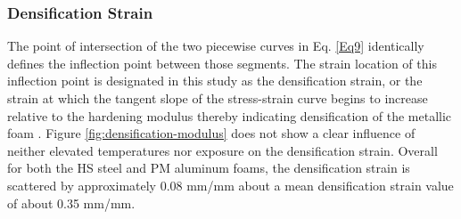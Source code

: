 \documentclass[review]{elsarticle}
\begin{document}
{\subsubsection{Densification Strain}

The point of intersection of the two piecewise curves in Eq. \ref{Eq9} identically defines the inflection point between those segments. The strain location of this inflection point is designated in this study as the densification strain, or the strain at which the tangent slope of the stress-strain curve begins to increase relative to the hardening modulus thereby indicating densification of the metallic foam . Figure \ref{fig:densification-modulus} does not show a clear influence of neither elevated temperatures nor exposure on the densification strain. Overall for both the HS steel and PM aluminum foams, the densification strain is scattered by approximately 0.08 mm/mm about a mean densification strain value of about 0.35 mm/mm.

}
\end{document}
